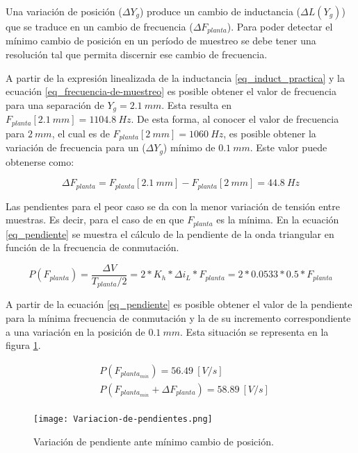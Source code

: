 Una variación de posición ($\Delta Y_g$) produce un cambio de inductancia ($\Delta L(Y_g)$) que se traduce en un cambio de frecuencia ($\Delta F_{planta}$). Para poder detectar el mínimo cambio de posición en un período de muestreo se debe tener una resolución tal que permita discernir ese cambio de frecuencia.


A partir de la expresión linealizada de la inductancia \ref{eq_induct_practica} y la ecuación \ref{eq_frecuencia-de-muestreo} es posible obtener el valor de frecuencia para una separación de $Y_g=2.1\:mm$. Esta resulta en $F_{planta}[2.1\:mm] = 1104.8\:Hz$. De esta forma, al conocer el valor de frecuencia para $2\:mm$, el cual es de $F_{planta}[2\:mm] = 1060\:Hz$, es posible obtener la variación de frecuencia para un ($\Delta Y_g$) mínimo de  $0.1\:mm$. Este valor puede obtenerse como:

\begin{equation} 
	\Delta F_{planta} = F_{planta}[2.1\:mm] - F_{planta}[2\:mm] = 44.8\:Hz
\end{equation}

 Las pendientes para el peor caso se da con la menor variación de tensión entre muestras. Es decir, para el caso de en que $F_{planta}$ es la mínima. En la ecuación \ref{eq_pendiente} se muestra el cálculo de la pendiente de la onda triangular en función de la frecuencia de conmutación.

\begin{equation} \label{eq_pendiente}
	P(F_{planta}) = \frac{\Delta V}{T_{planta}/2} = 2*K_h*\Delta i_L*F_{planta} = 2 * 0.0533 * 0.5 * F_{planta}
\end{equation}

 A partir de la ecuación \ref{eq_pendiente} es posible obtener el valor de la pendiente para la mínima frecuencia de conmutación y la de su incremento correspondiente a una variación en la posición de $0.1\:mm$. Esta situación se representa en la figura \ref{fig:variacion-de-pendiente}.

\begin{equation} 
	\begin{aligned}
		&P(F_{planta_{min}}) = 56.49\:[V/s] \\
		&P(F_{planta_{min}} + \Delta F_{planta}) = 58.89\:[V/s] \\
	\end{aligned}
\end{equation}

\begin{figure}[H]
	\centering
	\texttt{[image: Variacion-de-pendientes.png]}
	\caption{Variación de pendiente ante mínimo cambio de posición.}
	\label{fig:variacion-de-pendiente}
\end{figure}

